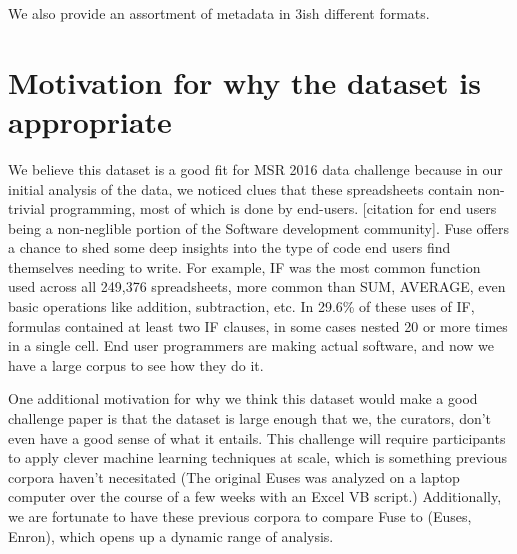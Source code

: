 \documentclass[conference]{IEEEtran}
\newcommand{\xlscount}{249,376}
\begin{document}
We also provide an assortment of metadata in 3ish different formats.




\section{Motivation for why the dataset is appropriate}

We believe this dataset is a good fit for MSR 2016 data challenge because in our initial analysis of the data, we noticed clues that these spreadsheets contain non-trivial programming, most of which is done by end-users.
[citation for end users being a non-neglible portion of the Software development community].  
Fuse offers a chance to shed some deep insights into the type of code end users find themselves needing to write.
For example, IF was the most common function used across all \xlscount{} spreadsheets, more common than SUM, AVERAGE, even basic operations like addition, subtraction, etc.
In 29.6\% of these uses of IF, formulas contained at least two IF clauses, in some cases nested 20 or more times in a single cell.
End user programmers are making actual software, and now we have a large corpus to see how they do it.

One additional motivation for why we think this dataset would make a good challenge paper is that the dataset is large enough that we, the curators, don't even have a good sense of what it entails.
This challenge will require participants to apply clever machine learning techniques at scale, which is something previous corpora haven't necesitated (The original Euses was analyzed on a laptop computer over the course of a few weeks with an Excel VB script.)
Additionally, we are fortunate to have these previous corpora to compare Fuse to (Euses, Enron), which opens up a dynamic range of analysis.
\end{document}
